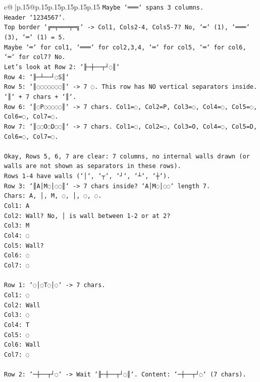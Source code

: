 \documentclass{article}
\begin{document}
{\begin{supertabular}{c@{$\;$}|p{.15\linewidth}@{}p{.15\linewidth}p{.15\linewidth}p{.15\linewidth}p{.15\linewidth}p{.15\linewidth}}
{{{\texttt{Maybe `═══` spans 3 columns.} \\
\texttt{Header `1234567`.} \\
\texttt{Top border `╔═╤═══╤═╗` {-}> Col1, Cols2{-}4, Cols5{-}7? No, `═` (1), `═══` (3), `═` (1) = 5.} \\
\texttt{Maybe `═` for col1, `═══` for col2,3,4, `═` for col5, `═` for col6, `═` for col7? No.} \\
\texttt{Let's look at Row 2: `╟─┼──┬┘◌║`} \\
\texttt{Row 4: `╟─┴──┘◌S║`} \\
\texttt{Row 5: `║◌◌◌◌◌◌◌║` {-}> 7 ◌. This row has NO vertical separators inside. `║` + 7 chars + `║`.} \\
\texttt{Row 6: `║◌P◌◌◌◌◌║` {-}> 7 chars. Col1=◌, Col2=P, Col3=◌, Col4=◌, Col5=◌, Col6=◌, Col7=◌.} \\
\texttt{Row 7: `║◌◌O◌D◌◌║` {-}> 7 chars. Col1=◌, Col2=◌, Col3=O, Col4=◌, Col5=D, Col6=◌, Col7=◌.} \\
\\ 
\texttt{Okay, Rows 5, 6, 7 are clear: 7 columns, no internal walls drawn (or walls are not shown as separators in these rows).} \\
\texttt{Rows 1{-}4 have walls (`│`, `┬`, `┘`, `┴`, `┼`).} \\
\texttt{Row 3: `║A│M◌│◌◌║` {-}> 7 chars inside? `A│M◌│◌◌` length 7.} \\
\texttt{Chars: A, │, M, ◌, │, ◌, ◌.} \\
\texttt{Col1: A} \\
\texttt{Col2: Wall? No, │ is wall between 1{-}2 or at 2?} \\
\texttt{Col3: M} \\
\texttt{Col4: ◌} \\
\texttt{Col5: Wall?} \\
\texttt{Col6: ◌} \\
\texttt{Col7: ◌} \\
\\ 
\texttt{Row 1: `◌│◌T◌│◌` {-}> 7 chars.} \\
\texttt{Col1: ◌} \\
\texttt{Col2: Wall} \\
\texttt{Col3: ◌} \\
\texttt{Col4: T} \\
\texttt{Col5: ◌} \\
\texttt{Col6: Wall} \\
\texttt{Col7: ◌} \\
\\ 
\texttt{Row 2: `─┼──┬┘◌` {-}> Wait `╟─┼──┬┘◌║`. Content: `─┼──┬┘◌` (7 chars).} \\
}}}
\end{supertabular}}
\end{document}
